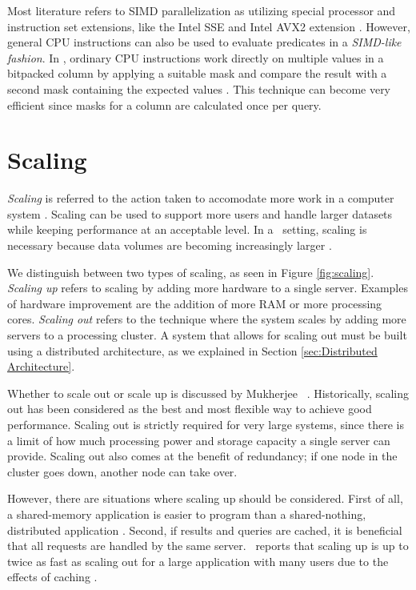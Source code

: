 Most literature refers to SIMD parallelization as utilizing special processor and instruction set extensions, like the Intel SSE and Intel AVX2 extension \cite{Willhalm2013-ri, Willhalm2009-hu}. However, general CPU instructions can also be used to evaluate predicates in a \textit{SIMD-like fashion}. In \blink, ordinary CPU instructions work directly on multiple values in a bitpacked column by applying a suitable mask and compare the result with a second mask containing the expected values \cite{Johnson2008-cp}. This technique can become very efficient since masks for a column are calculated once per query.

\section{Scaling}
\label{sec:Scaling}
\textit{Scaling} is referred to the action taken to accomodate more work in a computer system \cite{Wikipedia_contributors2015-lw}.  Scaling can be used to support more users and handle larger datasets while keeping performance at an acceptable level. In a \bd~setting, scaling is necessary because data volumes are becoming increasingly larger \cite{Qlik2012-ku}.


We distinguish between two types of scaling, as seen in Figure \ref{fig:scaling}. \textit{Scaling up} refers to scaling by adding more hardware to a single server. Examples of hardware improvement are the addition of more RAM or more processing cores. \textit{Scaling out} refers to the technique where the system scales by adding more servers to a processing cluster. A system that allows for scaling out must be built using a distributed architecture, as we explained in Section \ref{sec:Distributed Architecture}.

Whether to scale out or scale up is discussed by Mukherjee \ea~\cite{Mukherjee2015-ul}. Historically, scaling out has been considered as the best and most flexible way to achieve good performance. Scaling out is strictly required for very large systems, since there is a limit of how much processing power and storage capacity a single server can provide. Scaling out also comes at the benefit of redundancy; if one node in the cluster goes down, another node can take over.

However, there are situations where scaling up should be considered. First of all, a shared-memory application is easier to program than a shared-nothing, distributed application \cite{Boncz2002-yj}. Second, if results and queries are cached, it is beneficial that all requests are handled by the same server. \qlikview~reports that scaling up is up to twice as fast as scaling out for a large application with many users due to the effects of caching \cite{Qlik2012-ku}.

